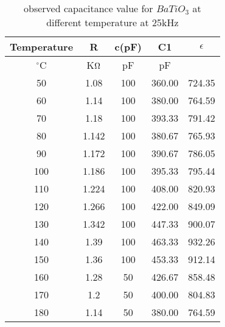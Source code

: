 \begin{table}[H]
    \centering
    \begin{tabular}{|c|c|c|c|c|}
        \hline
        Temperature & R       & c(pF) & C1     & $\epsilon$ \\ \hline
        $^{\circ}$C & K$\ohm$ & pF    & pF     & ~          \\ \hline
        50          & 1.08    & 100   & 360.00 & 724.35     \\ \hline
        60          & 1.14    & 100   & 380.00 & 764.59     \\ \hline
        70          & 1.18    & 100   & 393.33 & 791.42     \\ \hline
        80          & 1.142   & 100   & 380.67 & 765.93     \\ \hline
        90          & 1.172   & 100   & 390.67 & 786.05     \\ \hline
        100         & 1.186   & 100   & 395.33 & 795.44     \\ \hline
        110         & 1.224   & 100   & 408.00 & 820.93     \\ \hline
        120         & 1.266   & 100   & 422.00 & 849.09     \\ \hline
        130         & 1.342   & 100   & 447.33 & 900.07     \\ \hline
        140         & 1.39    & 100   & 463.33 & 932.26     \\ \hline
        150         & 1.36    & 100   & 453.33 & 912.14     \\ \hline
        160         & 1.28    & 50    & 426.67 & 858.48     \\ \hline
        170         & 1.2     & 50    & 400.00 & 804.83     \\ \hline
        180         & 1.14    & 50    & 380.00 & 764.59     \\ \hline
    \end{tabular}
    \caption{observed capacitance value for $BaTiO_3$ at different temperature at 25kHz}
    \label{tab:6}
\end{table}